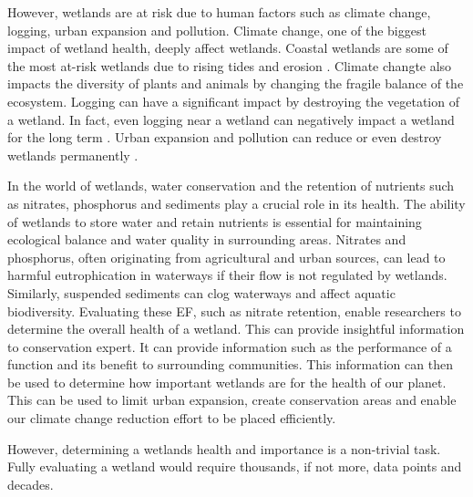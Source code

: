 \documentclass[12pt,letterpaper]{article}
\begin{document}
However, wetlands are at risk due to human factors such as climate change, logging, urban expansion and pollution.
Climate change, one of the biggest impact of wetland health, deeply affect wetlands.
Coastal wetlands are some of the most at-risk wetlands due to rising tides and erosion \cite{wa_ecology_wetlands_climate_change}.
Climate changte also impacts the diversity of plants and animals by changing the fragile balance of the ecosystem.
Logging can have a significant impact by destroying the vegetation of a wetland.
In fact, even logging near a wetland can negatively impact a wetland for the long term \cite{batzer2000influences}.
Urban expansion and pollution can reduce or even destroy wetlands permanently \cite{mao2018china,li2022heavy}.


In the world of wetlands, water conservation and the retention of nutrients such as nitrates, phosphorus and sediments play a crucial role in its health.
The ability of wetlands to store water and retain nutrients is essential for maintaining ecological balance and water quality in surrounding areas.
Nitrates and phosphorus, often originating from agricultural and urban sources, can lead to harmful eutrophication in waterways if their flow is not regulated by wetlands.
Similarly, suspended sediments can clog waterways and affect aquatic biodiversity.
Evaluating these \ac{EF}, such as nitrate retention, enable researchers to determine the overall health of a wetland.
This can provide insightful information to conservation expert.
It can provide information such as the performance of a function and its benefit to surrounding communities.
This information can then be used to determine how important wetlands are for the health of our planet.
This can be used to limit urban expansion, create conservation areas and enable our climate change reduction effort to be placed efficiently.

However, determining a wetlands health and importance is a non-trivial task.
Fully evaluating a wetland would require thousands, if not more, data points and decades.
\end{document}
